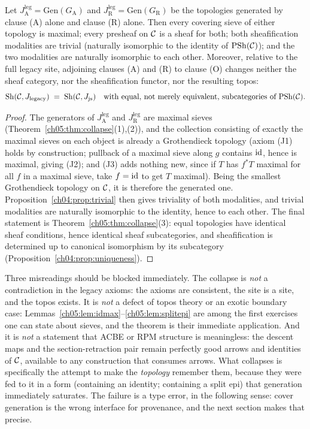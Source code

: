 \begin{corollary}\label{ch05:cor:trivial}
Let $J_{\mathrm{A}}^{\mathrm{leg}}=\mathrm{Gen}(G_{\mathrm{A}})$ and
$J_{\mathrm{R}}^{\mathrm{leg}}=\mathrm{Gen}(G_{\mathrm{R}})$ be the
topologies generated by clause (A) alone and clause (R) alone. Then every
covering sieve of either topology is maximal; every presheaf on $\mathcal{C}$ is a
sheaf for both; both sheafification modalities are trivial (naturally
isomorphic to the identity of $\mathrm{PSh}(\mathcal{C})$); and the two modalities are
naturally isomorphic to each other. Moreover, relative to the full legacy
site, adjoining clauses (A) and (R) to clause (O) changes neither the sheaf
category, nor the sheafification functor, nor the resulting topos:
\[
\mathrm{Sh}(\mathcal{C},J_{\mathrm{legacy}})\;=\;\mathrm{Sh}(\mathcal{C},J_{\mathrm{js}})
\quad\text{with equal, not merely equivalent, subcategories of }\mathrm{PSh}(\mathcal{C}).
\]
\end{corollary}

\begin{proof}
The generators of $J_{\mathrm{A}}^{\mathrm{leg}}$ and
$J_{\mathrm{R}}^{\mathrm{leg}}$ are maximal sieves
(Theorem~\ref{ch05:thm:collapse}(1),(2)), and the collection consisting of
exactly the maximal sieves on each object is already a Grothendieck topology
(axiom (J1) holds by construction; pullback of a maximal sieve along $g$
contains $\mathrm{id}$, hence is maximal, giving (J2); and (J3) adds nothing new,
since if $T$ has $f^{*}T$ maximal for all $f$ in a maximal sieve, take
$f=\mathrm{id}$ to get $T$ maximal). Being the smallest Grothendieck topology on
$\mathcal{C}$, it is therefore the generated one.
Proposition~\ref{ch04:prop:trivial} then gives triviality of
both modalities, and trivial modalities are naturally isomorphic to the
identity, hence to each other. The final statement is
Theorem~\ref{ch05:thm:collapse}(3): equal topologies have identical sheaf
conditions, hence identical sheaf subcategories, and sheafification is
determined up to canonical isomorphism by its subcategory
(Proposition~\ref{ch04:prop:uniqueness}).
\end{proof}

\begin{remark}\label{ch05:rem:whatnot}
Three misreadings should be blocked immediately. The collapse is \emph{not} a
contradiction in the legacy axioms: the axioms are consistent, the site is a
site, and the topos exists. It is \emph{not} a defect of topos theory or an
exotic boundary case: Lemmas~\ref{ch05:lem:idmax}--\ref{ch05:lem:splitepi}
are among the first exercises one can state about sieves, and the theorem is
their immediate application. And it is \emph{not} a statement that ACBE or
RPM structure is meaningless: the descent maps and the section-retraction
pair remain perfectly good arrows and identities of $\mathcal{C}$, available to any
construction that consumes arrows. What collapses is specifically the
attempt to make the \emph{topology} remember them, because they were fed to
it in a form (containing an identity; containing a split epi) that
generation immediately saturates. The failure is a type error, in the
following sense: cover generation is the wrong interface for provenance, and
the next section makes that precise.
\end{remark}


